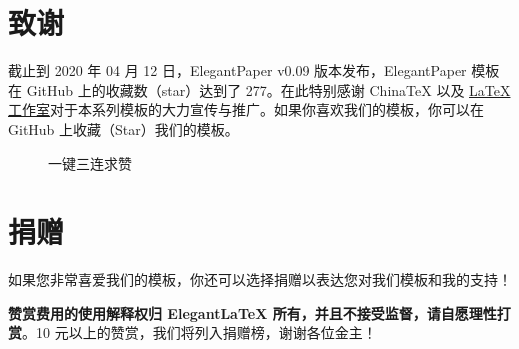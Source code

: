 \documentclass[lang=cn,11pt,a4paper,cite=authoryear]{elegantpaper}
\begin{document}
\section{致谢}
截止到 2020 年 04 月 12 日，ElegantPaper v0.09 版本发布，ElegantPaper 模板在 GitHub 上的收藏数（star）达到了 277。在此特别感谢 China\TeX{} 以及 \href{http://www.latexstudio.net/}{\LaTeX{} 工作室}对于本系列模板的大力宣传与推广。如果你喜欢我们的模板，你可以在 GitHub 上收藏（Star）我们的模板。
\begin{figure}[htbp]
  \centering

  \caption{一键三连求赞}
\end{figure}

\section{捐赠}
如果您非常喜爱我们的模板，你还可以选择捐赠以表达您对我们模板和我的支持！

\begin{figure}[htbp]
  \centering

\end{figure}

\textbf{赞赏费用的使用解释权归 Elegant\LaTeX{} 所有，并且不接受监督，请自愿理性打赏}。10 元以上的赞赏，我们将列入捐赠榜，谢谢各位金主！
\end{document}
